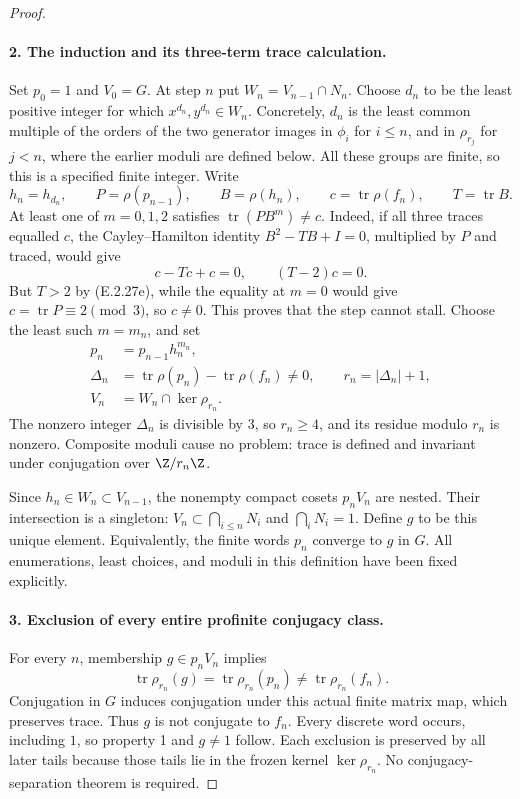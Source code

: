 \begin{proof}
\paragraph{2. The induction and its three-term trace calculation.}
Set \(p_0=1\) and \(V_0=G\). At step \(n\) put
\(W_n=V_{n-1}\cap N_n\). Choose \(d_n\) to be the least positive
integer for which \(x^{d_n},y^{d_n}\in W_n\). Concretely,
\(d_n\) is the least common multiple of the orders of the two
generator images in \(\phi_i\) for \(i\leq n\), and in
\(\rho_{r_j}\) for \(j<n\), where the earlier moduli are defined
below. All these groups are finite, so this is a specified finite
integer. Write
\[
 h_n=h_{d_n},\qquad P=\rho(p_{n-1}),\qquad B=\rho(h_n),
 \qquad c=\operatorname{tr}\rho(f_n),\qquad T=\operatorname{tr}B.
 \tag{E.2.27f}
\]
At least one of \(m=0,1,2\) satisfies
\(\operatorname{tr}(PB^m)\neq c\). Indeed, if all three traces
equalled \(c\), the Cayley--Hamilton identity
\(B^2-TB+I=0\), multiplied by \(P\) and traced, would give
\[
 c-Tc+c=0,\qquad (T-2)c=0.
 \tag{E.2.27g}
\]
But \(T>2\) by (E.2.27e), while the equality at \(m=0\) would
give \(c=\operatorname{tr}P\equiv2\pmod3\), so \(c\neq0\).
This proves that the step cannot stall. Choose the least such
\(m=m_n\), and set
\[
 \begin{split}
 p_n&=p_{n-1}h_n^{m_n},\\
 \Delta_n&=\operatorname{tr}\rho(p_n)-\operatorname{tr}\rho(f_n)
                    \neq0,\qquad r_n=|\Delta_n|+1,\\
 V_n&=W_n\cap\ker\rho_{r_n}.
 \end{split}
 \tag{E.2.27h}
\]
The nonzero integer \(\Delta_n\) is divisible by \(3\), so
\(r_n\geq4\), and its residue modulo \(r_n\) is nonzero.
Composite moduli cause no problem: trace is defined and invariant
under conjugation over \(\Z/r_n\Z\).

Since \(h_n\in W_n\subset V_{n-1}\), the nonempty compact cosets
\(p_nV_n\) are nested. Their intersection is a singleton:
\(V_n\subset\bigcap_{i\leq n}N_i\) and
\(\bigcap_iN_i=1\). Define \(g\) to be this unique element.
Equivalently, the finite words \(p_n\) converge to \(g\) in
\(G\). All enumerations, least choices, and moduli in this
definition have been fixed explicitly.

\paragraph{3. Exclusion of every entire profinite conjugacy class.}
For every \(n\), membership \(g\in p_nV_n\) implies
\[
 \operatorname{tr}\rho_{r_n}(g)
   =\operatorname{tr}\rho_{r_n}(p_n)
   \neq\operatorname{tr}\rho_{r_n}(f_n).
 \tag{E.2.27i}
\]
Conjugation in \(G\) induces conjugation under this actual finite
matrix map, which preserves trace. Thus \(g\) is not conjugate
to \(f_n\). Every discrete word occurs, including \(1\), so
property 1 and \(g\neq1\) follow. Each exclusion is preserved by
all later tails because those tails lie in the frozen kernel
\(\ker\rho_{r_n}\). No conjugacy-separation theorem is required.


\end{proof}
